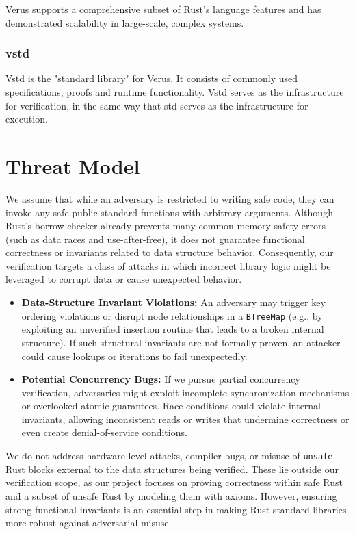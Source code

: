 \documentclass[conference]{IEEEtran}
\begin{document}
Verus supports a comprehensive subset of Rust's language features and has demonstrated scalability in large-scale, complex systems\cite{verus_publications}.

\subsubsection{vstd}
Vstd is the "standard library" for Verus. It consists of commonly used specifications, proofs and runtime functionality. Vstd serves as the infrastructure for verification, in the same way that std serves as the infrastructure for execution.     

\section{Threat Model}
We assume that while an adversary is restricted to writing safe code, they can invoke any safe public standard functions with arbitrary arguments. Although Rust's borrow checker already prevents many common memory safety errors (such as data races and use-after-free), it does not guarantee functional correctness or invariants related to data structure behavior. Consequently, our verification targets a class of attacks in which incorrect library logic might be leveraged to corrupt data or cause unexpected behavior.

\begin{itemize}
\item \textbf{Data-Structure Invariant Violations:} An adversary may trigger key ordering violations or disrupt node relationships in a \texttt{BTreeMap} (e.g., by exploiting an unverified insertion routine that leads to a broken internal structure). If such structural invariants are not formally proven, an attacker could cause lookups or iterations to fail unexpectedly.
\item \textbf{Potential Concurrency Bugs:} If we pursue partial concurrency verification, adversaries might exploit incomplete synchronization mechanisms or overlooked atomic guarantees. Race conditions could violate internal invariants, allowing inconsistent reads or writes that undermine correctness or even create denial-of-service conditions.
\end{itemize}

We do not address hardware-level attacks, compiler bugs, or misuse of \texttt{unsafe} Rust blocks external to the data structures being verified. These lie outside our verification scope, as our project focuses on proving correctness within safe Rust and a subset of unsafe Rust by modeling them with axioms. However, ensuring strong functional invariants is an essential step in making Rust standard libraries more robust against adversarial misuse.
\end{document}

